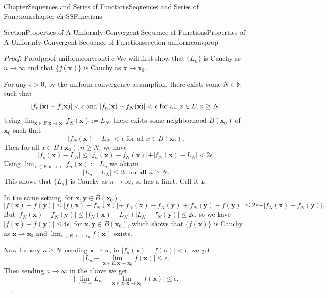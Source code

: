 \documentclass[oneside,10pt,]{book}
\numberwithin{equation}{section}
\newcommand{\bx}{\mathbf{x}}
\newcommand{\by}{\mathbf{y}}
\newcommand{\bbN}{\mathbb{N}}
\newcommand{\lt}{<}
\newcommand{\gt}{>}
\begin{document}
\begin{chapterptx}{Chapter}{Sequences and Series of Functions}{}{Sequences and Series of Functions}{}{}{chapter-ch-SSFunctions}
\begin{sectionptx}{Section}{Properties of A Uniformly Convergent Sequence of Functions}{}{Properties of A Uniformly Convergent Sequence of Functions}{}{}{section-uniformconvprop}
\begin{proof}{Proof}{}{proof-uniformconvconti-c}
We will first show that \(\{L_n\}\) is Cauchy as \(n\to\infty\) and that \(\{f(\bx)\}\) is Cauchy as \(\bx \to \bx_0\).%
\par
For any \(\epsilon \gt 0\), by the uniform convergence assumption, there exists some \(N\in \bbN\) such that%
\begin{equation*}
\vert f_n(\bx)-f(\bx)\vert \lt \epsilon \text{ and $ \vert f_n(\bx)-f_N(\bx)\vert \lt \epsilon$ for all $x\in E, n\ge N$}\text{.}
\end{equation*}
Using \(\lim_{\bx\in E, \bx \to \bx_0} f_N(\bx) :=L_N\), there exists some neighborhood \(B(\bx_0)\) of \(\bx_0\) such that%
\begin{equation*}
\vert f_N(\bx)-L_N \vert\lt \epsilon \text{ for all $x\in B(\bx_0)$.}
\end{equation*}
Then for all \(x\in B(\bx_0), n\ge N\), we have%
\begin{equation*}
\vert f_n(\bx)-L_N \vert\le \vert f_n(\bx)-f_N(\bx) \vert+ \vert f_N(\bx)-L_N \vert \lt 2\epsilon.
\end{equation*}
Using \(\lim_{\bx\in E, \bx \to \bx_0} f_n(\bx) :=L_n\) we obtain%
\begin{equation*}
\vert L_n-L_N \vert\le 2\epsilon \text{ for all $n\ge N$.}
\end{equation*}
This shows that \(\{L_n\}\) is Cauchy as \(n\to\infty\), so has a limit. Call it \(L\).%
\par
In the same setting, for \(\bx, \by \in B(\bx_0)\),%
\begin{equation*}
\vert f(\bx)-f(\by)\vert \le \vert f(\bx)-f_N(\bx)\vert + \vert f_N(\bx)-f_N(\by)\vert + \vert f_N(\by)-f(\by)\vert
\le 2\epsilon + \vert f_N(\bx)-f_N(\by)\vert.
\end{equation*}
But \(\vert f_N(\bx)-f_N(\by)\vert \le \vert f_N(\bx)-L_N\vert +\vert L_N-f_N(\by)\vert\le 2\epsilon\), so we have \(\vert f(\bx)-f(\by)\vert \le 4\epsilon\), for \(\bx, \by \in B(\bx_0)\), which shows that \(\{f(\bx)\}\) is Cauchy as \(\bx \to \bx_0\) and \(\lim_{\bx \in E, \bx\to \bx_0} f(\bx)\) exists.%
\par
Now for any \(n\ge N\), sending \(\bx\to \bx_0\) in \(\vert f_n(\bx)-f(\bx)\vert \lt \epsilon\), we get%
\begin{equation*}
\vert L_n-\lim_{\bx \in E, \bx\to \bx_0}f(\bx)\vert \le \epsilon.
\end{equation*}
Then sending \(n\to \infty\) in the above we get%
\begin{equation*}
\vert \lim_{n\to \infty} L_n-\lim_{\bx \in E, \bx\to \bx_0}f(\bx)\vert \le \epsilon.

\end{equation*}
\end{proof}
\end{sectionptx}
\end{chapterptx}
\end{document}
